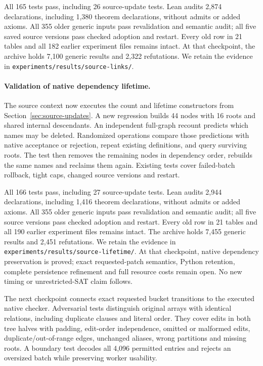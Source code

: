 \documentclass[11pt,a4paper]{article}
\numberwithin{equation}{section}
\theoremstyle{plain}
\theoremstyle{definition}
\theoremstyle{remark}
\begin{document}
All 165 tests pass, including 26 source-update tests. Lean audits 2,874 declarations, including 1,380 theorem declarations, without admits or added axioms. All 355 older generic inputs pass revalidation and semantic audit; all five saved source versions pass checked adoption and restart. Every old row in 21 tables and all 182 earlier experiment files remains intact. At that checkpoint, the archive holds 7,100 generic results and 2,322 refutations. We retain the evidence in \texttt{experiments/results/source-links/}.

\paragraph{Validation of native dependency lifetime.}
The source context now executes the count and lifetime constructors from Section~\ref{sec:source-updates}. A new regression builds 44 nodes with 16 roots and shared internal descendants. An independent full-graph recount predicts which names may be deleted. Randomized operations compare those predictions with native acceptance or rejection, repeat existing definitions, and query surviving roots. The test then removes the remaining nodes in dependency order, rebuilds the same names and reclaims them again. Existing tests cover failed-batch rollback, tight caps, changed source versions and restart.

All 166 tests pass, including 27 source-update tests. Lean audits 2,944 declarations, including 1,416 theorem declarations, without admits or added axioms. All 355 older generic inputs pass revalidation and semantic audit; all five source versions pass checked adoption and restart. Every old row in 21 tables and all 190 earlier experiment files remains intact. The archive holds 7,455 generic results and 2,451 refutations. We retain the evidence in \texttt{experiments/results/source-lifetime/}. At that checkpoint, native dependency preservation is proved; exact requested-patch semantics, Python retention, complete persistence refinement and full resource costs remain open. No new timing or unrestricted-SAT claim follows.

The next checkpoint connects exact requested bucket transitions to the executed native checker. Adversarial tests distinguish original arrays with identical relations, including duplicate clauses and literal order. They cover edits in both tree halves with padding, edit-order independence, omitted or malformed edits, duplicate/out-of-range edges, unchanged aliases, wrong partitions and missing roots. A boundary test decodes all 4,096 permitted entries and rejects an oversized batch while preserving worker usability.
\end{document}
